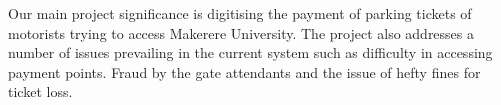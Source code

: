 Our main project significance is digitising the payment of parking tickets of motorists trying to access Makerere University. The project also addresses a number of issues prevailing in the current system such as difficulty in accessing payment points. Fraud by the gate attendants and the issue of hefty fines for ticket loss.
